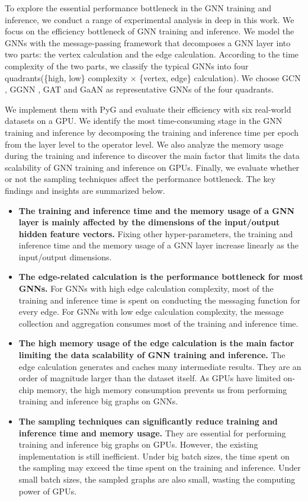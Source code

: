 To explore the essential performance bottleneck in the GNN training and inference, we conduct a range of experimental analysis in deep in this work. 
We focus on the efficiency bottleneck of GNN training and inference.
We model the GNNs with the message-passing framework that decomposes a GNN layer into two parts: the vertex calculation and the edge calculation.  
According to the time complexity of the two parts, we classify the typical GNNs into four quadrants(\{high, low\} complexity $\times$ \{vertex, edge\} calculation).
We choose GCN \cite{kipf2017_gcn}, GGNN \cite{li2015_ggnn}, GAT \cite{huang2018_gat} and GaAN \cite{zhang2018_gaan} as representative GNNs of the four quadrants.

We implement them with PyG and evaluate their efficiency with six real-world datasets on a GPU.
We identify the most time-consuming stage in the GNN training and inference by decomposing the training and inference time per epoch from the layer level to the operator level.
We also analyze the memory usage during the training and inference to discover the main factor that limits the data scalability of GNN training and inference on GPUs. 
Finally, we evaluate whether or not the sampling techniques affect the performance bottleneck. 
The key findings and insights are summarized below.

\begin{itemize}
    \item \textbf{The training and inference time and the memory usage of a GNN layer is mainly affected by the dimensions of the input/output hidden feature vectors.}
    Fixing other hyper-parameters, the training and inference time and the memory usage of a GNN layer increase linearly as the input/output dimensions.
    \item \textbf{The edge-related calculation is the performance bottleneck for most GNNs.}
    For GNNs with high edge calculation complexity, most of the training and inference time is spent on conducting the messaging function for every edge. 
    For GNNs with low edge calculation complexity, the message collection and aggregation consumes most of the training and inference time.
    \item \textbf{The high memory usage of the edge calculation is the main factor limiting the data scalability of GNN training and inference.}
    The edge calculation generates and caches many intermediate results. 
    They are an order of magnitude larger than the dataset itself. 
    As GPUs have limited on-chip memory, the high memory consumption prevents us from performing training and inference big graphs on GNNs.
    \item \textbf{The sampling techniques can significantly reduce training and inference time and memory usage.}
    They are essential for performing training and inference big graphs on GPUs. 
    However, the existing implementation is still inefficient. 
    Under big batch sizes, the time spent on the sampling may exceed the time spent on the training and inference. 
    Under small batch sizes, the sampled graphs are also small, wasting the computing power of GPUs.
\end{itemize}

